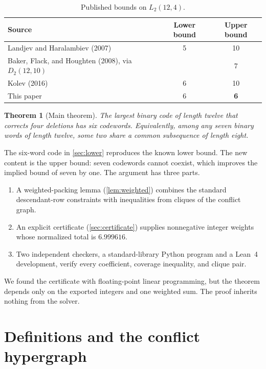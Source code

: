 \documentclass[11pt]{article}
\newtheorem{theorem}{Theorem}[section]
\theoremstyle{definition}
\begin{document}
\begin{table}[h]
\centering
\begin{tabular}{@{}lcc@{}}
\toprule
Source & Lower bound & Upper bound\\
\midrule
Landjev and Haralambiev (2007) \cite{landjev2007multiple} & 5 & 10\\
Baker, Flack, and Houghten (2008), via $D_2(12,10)$ \cite{baker2008variable} & & 7\\
Kolev (2016) \cite{kolev2016optimal} & 6 & 10\\
This paper & 6 & \textbf{6}\\
\bottomrule
\end{tabular}
\caption{Published bounds on $L_2(12,4)$.}
\label{tab:history}
\end{table}

\begin{theorem}[Main theorem]\label{thm:intro}
The largest binary code of length twelve that corrects four deletions has six
codewords.  Equivalently, among any seven binary words of length twelve, some
two share a common subsequence of length eight.
\end{theorem}

The six-word code in \cref{sec:lower} reproduces the known lower bound.  The
new content is the upper bound: seven codewords cannot coexist, which improves
the implied bound of seven by one.
The argument has three parts.
\begin{enumerate}[leftmargin=2.2em]
  \item A weighted-packing lemma (\cref{lem:weighted}) combines the standard
        descendant-row constraints with inequalities from cliques of the
        conflict graph.
  \item An explicit certificate (\cref{sec:certificate}) supplies
        nonnegative integer weights whose normalized total is $6.999616$.
  \item Two independent checkers, a standard-library Python program and a
        Lean~4 development, verify every coefficient, coverage inequality,
        and clique pair.
\end{enumerate}

We found the certificate with floating-point linear programming, but the
theorem depends only on the exported integers and one weighted sum.  The
proof inherits nothing from the solver.

\section{Definitions and the conflict hypergraph}
\end{document}
